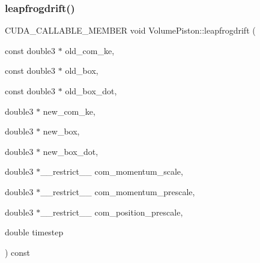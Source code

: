 \subsubsection{\texorpdfstring{leapfrogdrift()}{leapfrogdrift()}}
{\footnotesize\ttfamily C\+U\+D\+A\+\_\+\+C\+A\+L\+L\+A\+B\+L\+E\+\_\+\+M\+E\+M\+B\+ER void Volume\+Piston\+::leapfrogdrift (\begin{DoxyParamCaption}\item[{const double3 $\ast$}]{old\+\_\+com\+\_\+ke,  }\item[{const double3 $\ast$}]{old\+\_\+box,  }\item[{const double3 $\ast$}]{old\+\_\+box\+\_\+dot,  }\item[{double3 $\ast$}]{new\+\_\+com\+\_\+ke,  }\item[{double3 $\ast$}]{new\+\_\+box,  }\item[{double3 $\ast$}]{new\+\_\+box\+\_\+dot,  }\item[{double3 $\ast$\+\_\+\+\_\+restrict\+\_\+\+\_\+}]{com\+\_\+momentum\+\_\+scale,  }\item[{double3 $\ast$\+\_\+\+\_\+restrict\+\_\+\+\_\+}]{com\+\_\+momentum\+\_\+prescale,  }\item[{double3 $\ast$\+\_\+\+\_\+restrict\+\_\+\+\_\+}]{com\+\_\+position\+\_\+prescale,  }\item[{double}]{timestep }\end{DoxyParamCaption}) const\hspace{0.3cm}{\ttfamily [inline]}}


